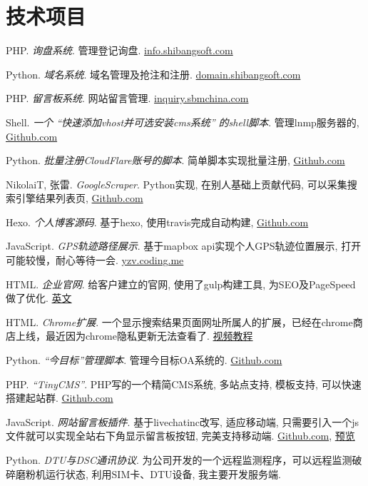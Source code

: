 \section{\textbf{技术项目}}
 \resumeSubHeadingListStart
   \item{
       PHP.
       \emph{询盘系统}.
       管理登记询盘. \href{http://info.shibangsoft.com}{info.shibangsoft.com}
   }
   \item{
       Python.
       \emph{域名系统}.
       域名管理及抢注和注册. \href{http://domain.shibangsoft.com}{domain.shibangsoft.com}
   }
   \item{
       PHP.
       \emph{留言板系统}.
       网站留言管理.  \href{http://inquiry.sbmchina.com}{inquiry.sbmchina.com}
   }
   \item{
       Shell.
       \emph{一个 ``快速添加vhost并可选安装cms系统'' 的shell脚本}.
       管理lnmp服务器的, \href{https://github.com/sbmzhcn/Tools}{Github.com}
   }
   \item{
       Python.
       \emph{批量注册CloudFlare账号的脚本}.
       简单脚本实现批量注册, \href{https://github.com/sbmzhcn/cloudflare}{Github.com}
   }
   \item{
       NikolaiT, 张雷.
       \emph{GoogleScraper}.
       Python实现, 在别人基础上贡献代码, 可以采集搜索引擎结果列表页, \href{https://github.com/NikolaiT/GoogleScraper/blob/master/AUTHORS}{Github.com}
   }
   \item{
       Hexo.
       \emph{个人博客源码}.
       基于hexo, 使用travis完成自动构建, \href{https://github.com/sbmzhcn/sbmzhcn.github.io/tree/source}{Github.com}
   }
   \item{
       JavaScript.
       \emph{GPS轨迹路径展示}.
       基于mapbox api实现个人GPS轨迹位置展示, 打开可能较慢，耐心等待一会. \href{http://yzv.coding.me/#portfolio/portfolio-4}{yzv.coding.me}
   }
   \item{
       HTML.
       \emph{企业官网}.
       给客户建立的官网, 使用了gulp构建工具, 为SEO及PageSpeed做了优化. \href{https://www.kamychina.com/}{英文}
   }
   \item{
       HTML.
       \emph{Chrome扩展}.
       一个显示搜索结果页面网址所属人的扩展，已经在chrome商店上线，最近因为chrome隐私更新无法查看了. \href{https://www.youtube.com/watch?v=mI_b94QjgTg}{视频教程}
   }
   \item{
       Python.
       \emph{``今目标''管理脚本}.
       管理今目标OA系统的. \href{https://github.com/sbmzhcn/Jingoal}{Github.com}
   }
   \item{
       PHP.
       \emph{``TinyCMS''}.
       PHP写的一个精简CMS系统, 多站点支持, 模板支持, 可以快速搭建起站群. \href{https://github.com/sbmzhcn/Jingoal}{Github.com}
   }
   \item{
       JavaScript.
       \emph{网站留言板插件}.
       基于livechatinc改写, 适应移动端, 只需要引入一个js文件就可以实现全站右下角显示留言板按钮, 完美支持移动端. \href{https://github.com/sbmzhcn/sbmzhcn.github.io/tree/master/livechat}{Github.com},
       \href{http://www.barrettbatemanfoundation.org/}{预览}
   }
   \item{
       Python.
       \emph{DTU与DSC通讯协议}.
       为公司开发的一个远程监测程序，可以远程监测破碎磨粉机运行状态, 利用SIM卡、DTU设备, 我主要开发服务端.
   }

 \resumeSubHeadingListEnd

